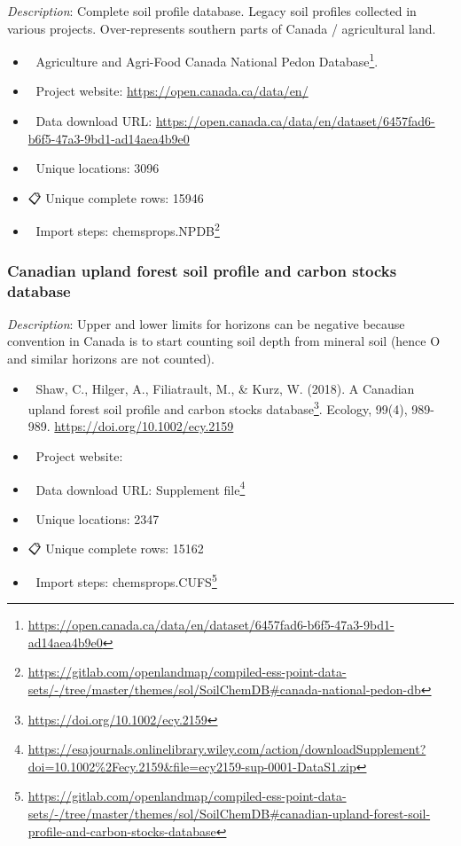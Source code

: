 \documentclass[
  graybox,natbib,nospthms]{svmono}
\providecommand{\tightlist}{%
  \setlength{\itemsep}{0pt}\setlength{\parskip}{0pt}}
\providecommand{\tightlist}{\setlength{\itemsep}{0pt}\setlength{\parskip}{0pt}}
\renewcommand{\href}[2]{#2 (\url{#1})}
\renewcommand{\href}[2]{#2\footnote{\url{#1}}}
\begin{document}
\emph{Description}: Complete soil profile database. Legacy soil profiles collected in
various projects. Over-represents southern parts of Canada / agricultural land.

\begin{itemize}
\tightlist
\item
  📕 \href{https://open.canada.ca/data/en/dataset/6457fad6-b6f5-47a3-9bd1-ad14aea4b9e0}{Agriculture and Agri-Food Canada National Pedon Database}.\\
\item
  🔗 Project website: \url{https://open.canada.ca/data/en/}\\
\item
  📂 Data download URL: \url{https://open.canada.ca/data/en/dataset/6457fad6-b6f5-47a3-9bd1-ad14aea4b9e0}\\
\item
  📍 Unique locations: 3096\\
\item
  📋 Unique complete rows: 15946\\
\item
  📝 Import steps: \href{https://gitlab.com/openlandmap/compiled-ess-point-data-sets/-/tree/master/themes/sol/SoilChemDB\#canada-national-pedon-db}{chemsprops.NPDB}
\end{itemize}

\hypertarget{canadian-upland-forest-soil-profile-and-carbon-stocks-database}{%
\subsubsection{Canadian upland forest soil profile and carbon stocks database}\label{canadian-upland-forest-soil-profile-and-carbon-stocks-database}}

\emph{Description}: Upper and lower limits for horizons can be negative because convention
in Canada is to start counting soil depth from mineral soil (hence O and similar horizons
are not counted).

\begin{itemize}
\tightlist
\item
  📕 Shaw, C., Hilger, A., Filiatrault, M., \& Kurz, W. (2018). \href{https://doi.org/10.1002/ecy.2159}{A Canadian upland forest soil profile and carbon stocks database}. Ecology, 99(4), 989-989. \url{https://doi.org/10.1002/ecy.2159}
\item
  🔗 Project website:\\
\item
  📂 Data download URL: \href{https://esajournals.onlinelibrary.wiley.com/action/downloadSupplement?doi=10.1002\%2Fecy.2159\&file=ecy2159-sup-0001-DataS1.zip}{Supplement file}\\
\item
  📍 Unique locations: 2347\\
\item
  📋 Unique complete rows: 15162\\
\item
  📝 Import steps: \href{https://gitlab.com/openlandmap/compiled-ess-point-data-sets/-/tree/master/themes/sol/SoilChemDB\#canadian-upland-forest-soil-profile-and-carbon-stocks-database}{chemsprops.CUFS}
\end{itemize}
\end{document}
